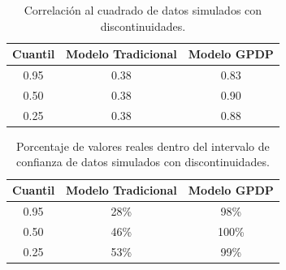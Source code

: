 \begin{table}[H]
\centering
\caption{Correlación al cuadrado de datos simulados con discontinuidades.}
\begin{tabular}{ccc}
  \hline
Cuantil & Modelo Tradicional & Modelo GPDP \\ 
  \hline
0.95 & 0.38 & 0.83 \\ 
  0.50 & 0.38 & 0.90 \\ 
  0.25 & 0.38 & 0.88 \\ 
   \hline
\end{tabular}
\label{corr_discontinuous}
\end{table}

\begin{table}[H]
\centering
\caption{Porcentaje de valores reales dentro del intervalo de confianza de datos simulados con discontinuidades.} 
\begin{tabular}{ccc}
  \hline
Cuantil & Modelo Tradicional & Modelo GPDP \\ 
  \hline
0.95 & 28\% & 98\% \\ 
  0.50 & 46\% & 100\% \\ 
  0.25 & 53\% & 99\% \\ 
   \hline
\end{tabular}
\label{within_discontinuous}
\end{table}

